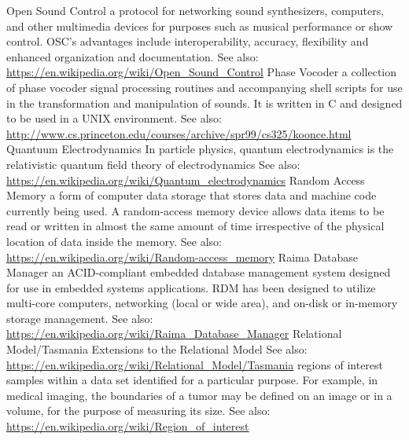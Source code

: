 	{Open Sound Control }
	{a protocol for networking sound synthesizers, computers, and other multimedia devices for purposes such as musical performance or show control. OSC's advantages include interoperability, accuracy, flexibility and enhanced organization and documentation. See also: \url{https://en.wikipedia.org/wiki/Open_Sound_Control}}
	{Phase Vocoder}
	{a collection of phase vocoder signal processing routines and accompanying shell scripts for use in the transformation and manipulation of sounds. It is written in C and designed to be used in a UNIX environment. See also: \url{http://www.cs.princeton.edu/courses/archive/spr99/cs325/koonce.html}}
	{Quantuum Electrodynamics}
	{In particle physics, quantum electrodynamics is the relativistic quantum field theory of electrodynamics See also: \url{https://en.wikipedia.org/wiki/Quantum_electrodynamics}}
	{Random Access Memory }
	{a form of computer data storage that stores data and machine code currently being used. A random-access memory device allows data items to be read or written in almost the same amount of time irrespective of the physical location of data inside the memory. See also: \url{https://en.wikipedia.org/wiki/Random-access_memory}}
	{Raima Database Manager }
	{an ACID-compliant embedded database management system designed for use in embedded systems applications. RDM has been designed to utilize multi-core computers, networking (local or wide area), and on-disk or in-memory storage management. See also: \url{https://en.wikipedia.org/wiki/Raima_Database_Manager}}
	{Relational Model/Tasmania}
	{Extensions to the Relational Model See also: \url{https://en.wikipedia.org/wiki/Relational_Model/Tasmania}}
	{regions of interest}
	{samples within a data set identified for a particular purpose. For example, in medical imaging, the boundaries of a tumor may be defined on an image or in a volume, for the purpose of measuring its size. See also: \url{https://en.wikipedia.org/wiki/Region_of_interest}}
